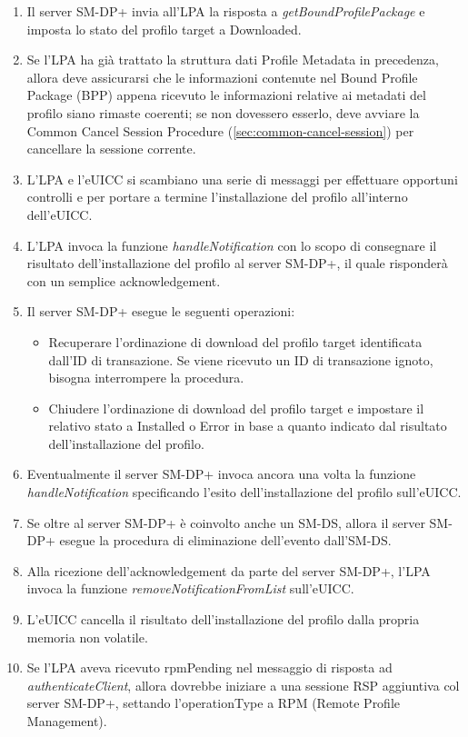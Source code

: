 \documentclass[10pt, oneside]{book}
\begin{document}
\begin{enumerate}
\item Il server SM-DP+ invia all'LPA la risposta a \textit{getBoundProfilePackage} e imposta lo stato del profilo target a Downloaded.
\item Se l'LPA ha già trattato la struttura dati Profile Metadata in precedenza, allora deve assicurarsi che le informazioni contenute nel Bound Profile Package (BPP) appena ricevuto le informazioni relative ai metadati del profilo siano rimaste coerenti; se non dovessero esserlo, deve avviare la Common Cancel Session Procedure (\ref{sec:common-cancel-session}) per cancellare la sessione corrente.
\item L'LPA e l'eUICC si scambiano una serie di messaggi per effettuare opportuni controlli e per portare a termine l'installazione del profilo all'interno dell'eUICC.
\item L'LPA invoca la funzione \textit{handleNotification} con lo scopo di consegnare il risultato dell'installazione del profilo al server SM-DP+, il quale risponderà con un semplice acknowledgement.
\item Il server SM-DP+ esegue le seguenti operazioni:
\begin{itemize}[itemsep=0pt]
\item Recuperare l'ordinazione di download del profilo target identificata dall'ID di transazione. Se viene ricevuto un ID di transazione ignoto, bisogna interrompere la procedura.
\item Chiudere l'ordinazione di download del profilo target e impostare il relativo stato a Installed o Error in base a quanto indicato dal risultato dell'installazione del profilo.
\end{itemize}
\item Eventualmente il server SM-DP+ invoca ancora una volta la funzione \textit{handleNotification} specificando l'esito dell'installazione del profilo sull'eUICC.
\item Se oltre al server SM-DP+ è coinvolto anche un SM-DS, allora il server SM-DP+ esegue la procedura di eliminazione dell'evento dall'SM-DS.
\item Alla ricezione dell'acknowledgement da parte del server SM-DP+, l'LPA invoca la funzione \textit{removeNotificationFromList} sull'eUICC.
\item L'eUICC cancella il risultato dell'installazione del profilo dalla propria memoria non volatile.
\item Se l'LPA aveva ricevuto rpmPending nel messaggio di risposta ad \textit{authenticateClient}, allora dovrebbe iniziare a una sessione RSP aggiuntiva col server SM-DP+, settando l'operationType a RPM (Remote Profile Management).
\end{enumerate}
\end{document}
